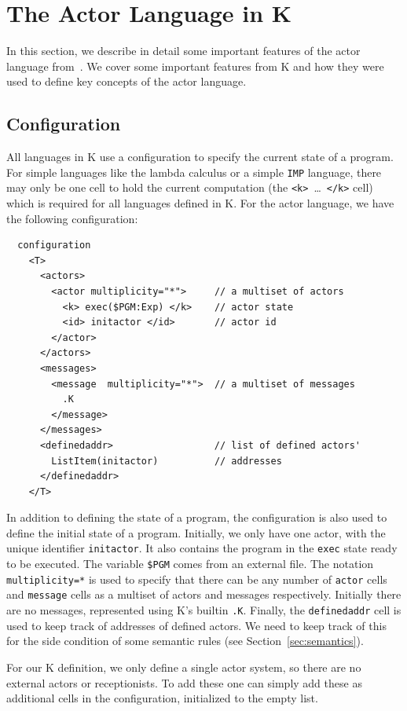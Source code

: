\documentclass{llncs}
\begin{document}
\section{The Actor Language in K}
In this section, we describe in detail some important features of the actor
language from~\cite{actor}. We cover some important features from K and how 
they were
used to define key concepts of the actor language.

\subsection{Configuration}\label{sec:configuration}
All languages in K use a configuration to specify the current state of a
program. For simple languages like the lambda calculus or a simple \texttt{IMP}
language, there may only be one cell to hold the current computation (the
\texttt{<k>}\ \dots\ \texttt{</k>} cell) which is required for all languages
defined in K. For the actor language, we have the following configuration:
\begin{verbatim}
  configuration 
    <T>
      <actors>
        <actor multiplicity="*">     // a multiset of actors
          <k> exec($PGM:Exp) </k>    // actor state
          <id> initactor </id>       // actor id
        </actor>
      </actors>
      <messages>
        <message  multiplicity="*">  // a multiset of messages
          .K
        </message>
      </messages>
      <definedaddr>                  // list of defined actors'
        ListItem(initactor)          // addresses
      </definedaddr>
    </T>
\end{verbatim}
In addition to defining the state of a program, the configuration is also used
to define the initial state of a program. Initially, we only have one actor,
with the unique identifier \texttt{initactor}. It also contains the program in
the \texttt{exec} state ready to be executed. The variable \texttt{\$PGM} comes
from an external file. The notation \texttt{multiplicity=*} is used to specify
that there can be any number of \texttt{actor} cells and \texttt{message} cells
as a multiset of actors and messages respectively. Initially there are no
messages, represented using K's builtin \texttt{.K}. Finally, the
\texttt{definedaddr} cell is used to keep track of addresses of defined
actors. We need to keep track of this for the side condition of some semantic
rules (see Section~\ref{sec:semantics}).

For our K definition, we only define a single actor system, so there are no
external actors or receptionists. To add these one can simply add these as
additional cells in the configuration, initialized to the empty list.
\end{document}
